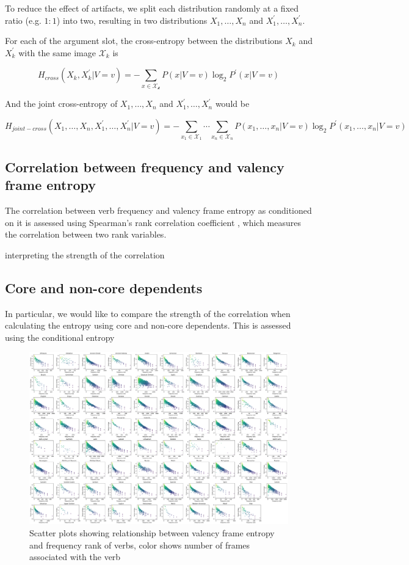 To reduce the effect of artifacts, we split each distribution randomly at a fixed ratio (e.g. $1:1$) into two, resulting in two distributions $X_1,\ldots,X_n$ and $X^{\prime}_{1},\ldots,X^{\prime}_{n}$. 

For each of the argument slot, the cross-entropy between the distributions $X_k$ and $X_k^{\prime}$ with the same image $\mathcal{X}_{k}$ is

$$
H_{cross}{(X_k,X_k^{\prime}|V=v)}=
-\sum\limits_{x\in{}\mathcal{X_{k}}}{P(x|V=v)\log_{2}{P^{\prime}(x|V=v)}}
$$

And the joint cross-entropy of  $X_1,\ldots,X_n$ and $X_1^{\prime},\ldots,X_n^{\prime}$ would be

$$
H_{joint-cross}(X_{1},\ldots,X_{n},X_{1}^{\prime},\ldots,X_{n}^{\prime}|V=v)=
-\sum\limits_{x_1\in{}\mathcal{X}_1}\cdots\sum\limits_{x_n\in{}\mathcal{X}_n}{P(x_1,\ldots,x_{n}|V=v)\log_{2}P^{\prime}(x_1,\ldots,x_n|V=v)}
$$

\subsection{Correlation between frequency and valency frame entropy}

The correlation between verb frequency and valency frame entropy as conditioned on it is assessed using Spearman's rank correlation coefficient \citep{spearman1904}, which measures the correlation between two rank variables. 

interpreting the strength of the correlation \citep{schober2018}

\subsection{Core and non-core dependents}

In particular, we would like to compare the strength of the correlation when calculating the entropy using core and non-core dependents. This is assessed using the conditional entropy

\begin{figure}
  \centering
  \includegraphics[width=\textwidth]{figures/joint_entropy_freq.pdf}
  \caption{Scatter plots showing relationship between valency frame entropy and frequency rank of verbs, color shows number of frames associated with the verb}
  \label{fig:joint_entropy_freq}
\end{figure}


